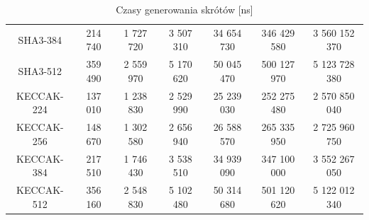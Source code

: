 \documentclass[10pt,a4paper]{article}
\begin{document}
\begin{table}[ht]
\begin{tabular}{ |c|c|c|c|c|c|c| }
        SHA3-384       & 214 740                                                  & 1 727 720 & 3 507 310 & 34 654 730 & 346 429 580 & 3 560 152 370 \\
        SHA3-512       & 359 490                                                  & 2 559 970 & 5 170 620 & 50 045 470 & 500 127 970 & 5 123 728 380 \\
        KECCAK-224     & 137 010                                                  & 1 238 830 & 2 529 990 & 25 239 030 & 252 275 480 & 2 570 850 040 \\
        KECCAK-256     & 148 670                                                  & 1 302 580 & 2 656 940 & 26 588 570 & 265 335 950 & 2 725 960 750 \\
        KECCAK-384     & 217 510                                                  & 1 746 430 & 3 538 510 & 34 939 090 & 347 100 000 & 3 552 267 050 \\
        KECCAK-512     & 356 160                                                  & 2 548 830 & 5 102 480 & 50 314 680 & 501 120 620 & 5 122 012 340 \\
        \hline
    \end{tabular}
    \caption{Czasy generowania skrótów [ns]}
\end{table}
\end{document}
